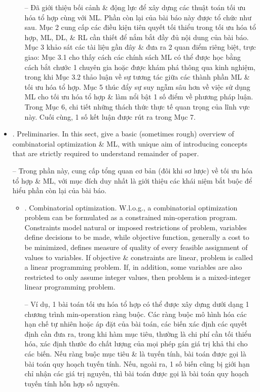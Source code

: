 \documentclass{article}
\begin{document}
\begin{itemize}
\begin{itemize}
        -- Đã giới thiệu bối cảnh \& động lực để xây dựng các thuật toán tối ưu hóa tổ hợp cùng với ML. Phần còn lại của bài báo này được tổ chức như sau. Mục 2 cung cấp các điều kiện tiên quyết tối thiểu trong tối ưu hóa tổ hợp, ML, DL, \& RL cần thiết để nắm bắt đầy đủ nội dung của bài báo. Mục 3 khảo sát các tài liệu gần đây \& đưa ra 2 quan điểm riêng biệt, trực giao: Mục 3.1 cho thấy cách các chính sách ML có thể được học bằng cách bắt chước 1 chuyên gia hoặc được khám phá thông qua kinh nghiệm, trong khi Mục 3.2 thảo luận về sự tương tác giữa các thành phần ML \& tối ưu hóa tổ hợp. Mục 5 thúc đẩy sự suy ngẫm sâu hơn về việc sử dụng ML cho tối ưu hóa tổ hợp \& làm nổi bật 1 số điểm về phương pháp luận. Trong Mục 6, chi tiết những thách thức thực tế quan trọng của lĩnh vực này. Cuối cùng, 1 số kết luận được rút ra trong Mục 7.
    \end{itemize}
    \item {. Preliminaries.} In this sect, give a basic (sometimes rough) overview of combinatorial optimization \& ML, with unique aim of introducing concepts that are strictly required to understand remainder of paper.

    -- Trong phần này, cung cấp tổng quan cơ bản (đôi khi sơ lược) về tối ưu hóa tổ hợp \& ML, với mục đích duy nhất là giới thiệu các khái niệm bắt buộc để hiểu phần còn lại của bài báo.
    \begin{itemize}
        \item {. Combinatorial optimization.} W.l.o.g., a combinatorial optimization problem can be formulated as a constrained min-operation program. Constraints model natural or imposed restrictions of problem, variables define decisions to be made, while objective function, generally a cost to be minimized, defines measure of quality of every feasible assignment of values to variables. If objective \& constraints are linear, problem is called a linear programming problem. If, in addition, some variables are also restricted to only assume integer values, then problem is a mixed-integer linear programming problem.

        -- Ví dụ, 1 bài toán tối ưu hóa tổ hợp có thể được xây dựng dưới dạng 1 chương trình min-operation ràng buộc. Các ràng buộc mô hình hóa các hạn chế tự nhiên hoặc áp đặt của bài toán, các biến xác định các quyết định cần đưa ra, trong khi hàm mục tiêu, thường là chi phí cần tối thiểu hóa, xác định thước đo chất lượng của mọi phép gán giá trị khả thi cho các biến. Nếu ràng buộc mục tiêu \& là tuyến tính, bài toán được gọi là bài toán quy hoạch tuyến tính. Nếu, ngoài ra, 1 số biến cũng bị giới hạn chỉ nhận các giá trị nguyên, thì bài toán được gọi là bài toán quy hoạch tuyến tính hỗn hợp số nguyên.


\end{itemize}
\end{itemize}
\end{document}
